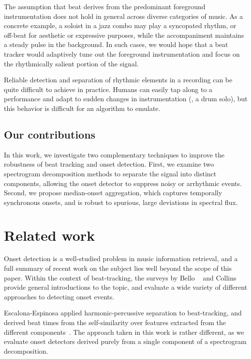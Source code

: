 \documentclass{article}
\begin{document}
The assumption that beat derives from the predominant foreground instrumentation does not 
hold in general across diverse categories of music. As a concrete example, a soloist in a 
jazz combo may play a syncopated rhythm, or off-beat for aesthetic or expressive purposes, 
while the accompaniment maintains a steady pulse in the background.  
In such cases, we would hope that a beat tracker would adaptively tune out the foreground 
instrumentation and focus on the rhythmically salient portion of the signal.

Reliable detection and separation of rhythmic elements in a recording can be quite
difficult to achieve in practice.  Humans can easily tap along to a
performance and adapt to sudden changes in instrumentation (\eg, a drum solo), but 
this behavior is difficult for an algorithm to emulate.

\subsection{Our contributions}
In this work, we investigate two complementary techniques to improve the robustness of 
beat tracking and onset detection. First, we examine two spectrogram decomposition 
methods to separate the signal into distinct components, allowing the onset detector to 
suppress noisy or arrhythmic events. Second, we propose median-onset aggregation, which 
captures temporally synchronous onsets, and is robust to spurious, large deviations in 
spectral flux.

\section{Related work}
\label{sec:related}
Onset detection is a well-studied problem in music information retrieval, and a full
summary of recent work on the subject lies well beyond the scope of this paper.
Within the context of beat-tracking, the surveys by Bello \etal~\cite{bello2005tutorial}
and Collins~\cite{collins2005comparison} provide general introductions to the topic, and
evaluate a wide variety of different approaches to detecting onset events.  

Escalona-Espinosa applied harmonic-percussive separation to beat-tracking, and derived beat 
times from the self-similarity over features extracted from the different 
components~\cite{escalona2008downbeat}.  The approach taken in this work is rather
different, as we evaluate onset detectors derived purely from a single component of a
spectrogram decomposition.
\end{document}
